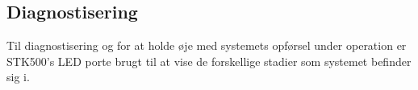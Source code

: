 \subsection{Diagnostisering}
Til diagnostisering og for at holde øje med systemets opførsel under operation er STK500's LED porte brugt til at vise de forskellige stadier som systemet befinder sig i.
